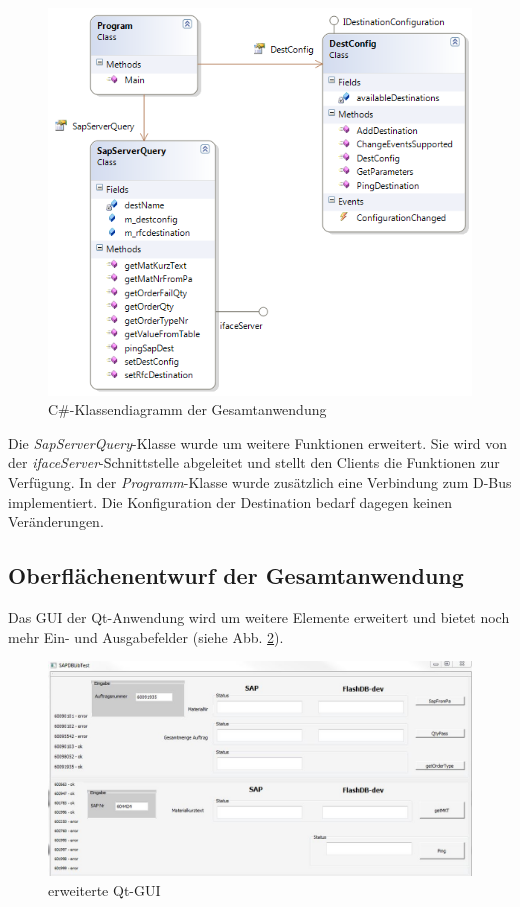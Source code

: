 \begin{figure}[H]
	\centering
	\includegraphics[width=1\linewidth]{images/KlassendiagramGesamt}
	\caption[C\#-Klassendiagramm der Gesamtanwendung]{C\#-Klassendiagramm der Gesamtanwendung}
	\label{fig:KlassendiagramGesamt}
\end{figure}
Die \textit{SapServerQuery}-Klasse wurde um weitere Funktionen erweitert. Sie wird von der \textit{ifaceServer}-Schnittstelle abgeleitet und stellt den Clients die Funktionen zur Verfügung. In der \textit{Programm}-Klasse wurde zusätzlich eine Verbindung zum D-Bus implementiert. Die Konfiguration der Destination bedarf dagegen keinen Veränderungen.\\

\subsection{Oberflächenentwurf der Gesamtanwendung}
Das GUI der Qt-Anwendung wird um weitere Elemente erweitert und bietet noch mehr Ein- und Ausgabefelder (siehe Abb. \ref{fig:QtGui}). 

\begin{figure}[H]
\centering
\includegraphics[width=1\linewidth]{images/QtGui}
\caption[erweiterte Qt-GUI]{erweiterte Qt-GUI}
\label{fig:QtGui}
\end{figure}

